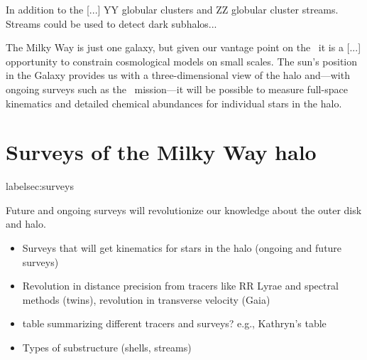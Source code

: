 In addition to the [...] YY globular clusters and ZZ globular cluster streams.
Streams could be used to detect dark subhalos...

The Milky Way is just one galaxy, but given our vantage point on the \mwhalo\ it
is a [...] opportunity to constrain cosmological models on small scales. The
sun's position in the Galaxy provides us with a three-dimensional view of the
halo and---with ongoing surveys such as the \gaia\ mission---it will be possible
to measure full-space kinematics and detailed chemical abundances for individual
stars in the halo.

\section{Surveys of the Milky Way halo}label{sec:surveys}

Future and ongoing surveys will revolutionize our knowledge about the outer disk
and halo.

\begin{itemize}     \item Surveys that will get kinematics for stars in the halo
(ongoing and future surveys)     \item Revolution in distance precision from
tracers like RR Lyrae and spectral methods (twins), revolution in transverse
velocity (Gaia)     \item table summarizing different tracers and surveys? e.g.,
Kathryn's table     \item Types of substructure (shells, streams) \end{itemize}

